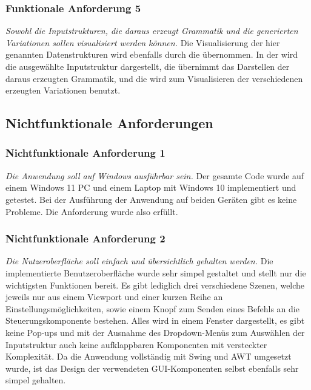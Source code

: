 \subsubsection{Funktionale Anforderung 5}
\textit{Sowohl die Inputstrukturen, die daraus erzeugt Grammatik und die generierten Variationen sollen visualisiert werden können.} Die Visualisierung
der hier genannten Datenstrukturen wird ebenfalls durch die  übernommen. In der  wird die ausgewählte
Inputstruktur dargestellt, die  übernimmt das Darstellen der daraus erzeugten Grammatik, und die  wird zum
Visualisieren der verschiedenen erzeugten Variationen benutzt.

\subsection{Nichtfunktionale Anforderungen}
\subsubsection{Nichtfunktionale Anforderung 1}
\textit{Die Anwendung soll auf Windows ausführbar sein.} Der gesamte Code wurde auf einem Windows 11 PC und einem Laptop mit Windows 10 implementiert
und getestet. Bei der Ausführung der Anwendung auf beiden Geräten gibt es keine Probleme. Die Anforderung wurde also erfüllt.

\subsubsection{Nichtfunktionale Anforderung 2}
\textit{Die Nutzeroberfläche soll einfach und übersichtlich gehalten werden.} Die implementierte Benutzeroberfläche wurde sehr simpel gestaltet und
stellt nur die wichtigsten Funktionen bereit. Es gibt lediglich drei verschiedene Szenen, welche jeweils nur aus einem Viewport und einer kurzen
Reihe an Einstellungsmöglichkeiten, sowie einem Knopf zum Senden eines Befehls an die Steuerungskomponente bestehen. Alles wird in einem Fenster
dargestellt, es gibt keine Pop-ups und mit der Ausnahme des Dropdown-Menüs zum Auswählen der Inputstruktur auch keine aufklappbaren Komponenten mit
versteckter Komplexität. Da die Anwendung vollständig mit Swing und AWT umgesetzt wurde, ist das Design der verwendeten GUI-Komponenten selbst ebenfalls
sehr simpel gehalten.

